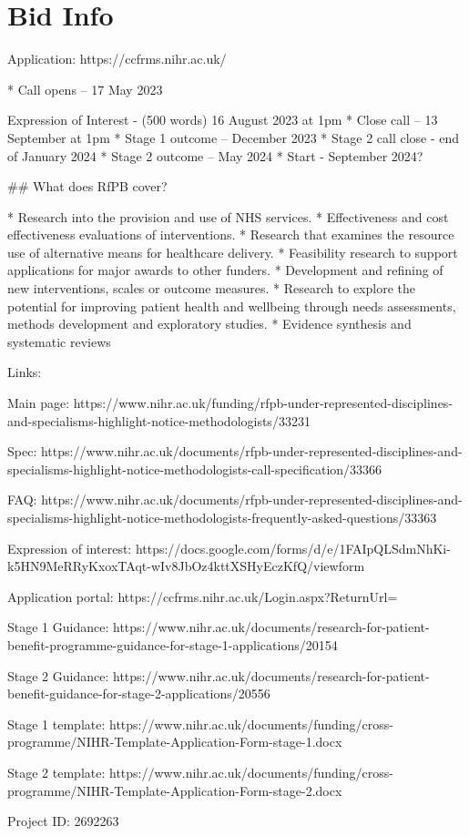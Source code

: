 \section{Bid Info}

Application:  https://ccfrms.nihr.ac.uk/

 
\begin{markdown}

* Call opens – 17 May 2023    \item Expression of Interest - (500 words) 16 August 2023 at 1pm
* Close call – 13 September at 1pm
* Stage 1 outcome – December 2023
* Stage 2 call close - end of January 2024
* Stage 2 outcome – May 2024
* Start - September 2024?

## What does RfPB cover?

* Research into the provision and use of NHS services.
* Effectiveness and cost effectiveness evaluations of interventions.
* Research that examines the resource use of alternative means for healthcare delivery.
* Feasibility research to support applications for major awards to other funders.
* Development and refining of new interventions, scales or outcome measures.
*  Research to explore the potential for improving patient health and wellbeing through needs assessments, methods development and exploratory studies.
* Evidence synthesis and systematic reviews


Links:

Main page: https://www.nihr.ac.uk/funding/rfpb-under-represented-disciplines-and-specialisms-highlight-notice-methodologists/33231

Spec: https://www.nihr.ac.uk/documents/rfpb-under-represented-disciplines-and-specialisms-highlight-notice-methodologists-call-specification/33366

FAQ: https://www.nihr.ac.uk/documents/rfpb-under-represented-disciplines-and-specialisms-highlight-notice-methodologists-frequently-asked-questions/33363

Expression of interest: https://docs.google.com/forms/d/e/1FAIpQLSdmNhKi-k5HN9MeRRyKxoxTAqt-wIv8JbOz4kttXSHyEczKfQ/viewform

Application portal: https://ccfrms.nihr.ac.uk/Login.aspx?ReturnUrl=%

Stage 1 Guidance: https://www.nihr.ac.uk/documents/research-for-patient-benefit-programme-guidance-for-stage-1-applications/20154

Stage 2 Guidance: https://www.nihr.ac.uk/documents/research-for-patient-benefit-guidance-for-stage-2-applications/20556

Stage 1 template: https://www.nihr.ac.uk/documents/funding/cross-programme/NIHR-Template-Application-Form-stage-1.docx

Stage 2 template: https://www.nihr.ac.uk/documents/funding/cross-programme/NIHR-Template-Application-Form-stage-2.docx


\end{markdown}

Project ID: 2692263
